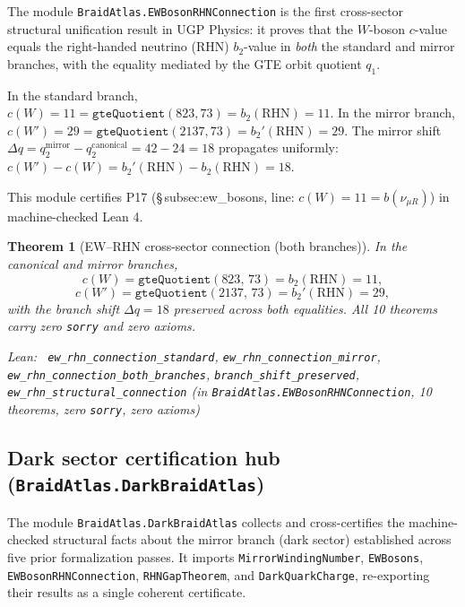 \documentclass[11pt,a4paper]{article}
\newenvironment{leanref}%
  {\par\smallskip\noindent\begingroup\raggedright\textup{Lean:}~}%
  {\par\endgroup}
\newtheorem{theorem}{Theorem}[section]
\theoremstyle{definition}
\begin{document}
The module \texttt{BraidAtlas.EWBosonRHNConnection} is the first cross-sector
structural unification result in UGP Physics: it proves that the $W$-boson
$c$-value equals the right-handed neutrino (RHN) $b_2$-value in \emph{both}
the standard and mirror branches, with the equality mediated by the GTE orbit
quotient $q_1$.

In the standard branch,
$c(W) = 11 = \mathtt{gteQuotient}(823, 73) = b_2(\text{RHN}) = 11$.
In the mirror branch,
$c(W') = 29 = \mathtt{gteQuotient}(2137, 73) = b_2'(\text{RHN}) = 29$.
The mirror shift $\Delta q = q_2^{\text{mirror}} - q_2^{\text{canonical}} = 42 - 24 = 18$
propagates uniformly: $c(W') - c(W) = b_2'(\text{RHN}) - b_2(\text{RHN}) = 18$.

This module certifies P17 \cite{SpivackBraidAtlas} (\S\,subsec:ew\_bosons,
line: $c(W) = 11 = b(\nu_{\mu R})$) in machine-checked Lean 4.

\begin{theorem}[EW--RHN cross-sector connection (both branches)]\label{thm:ew_rhn}
In the canonical and mirror branches,
\[
  c(W) = \mathtt{gteQuotient}(823,\, 73) = b_2(\mathrm{RHN}) = 11,
\]
\[
  c(W') = \mathtt{gteQuotient}(2137,\, 73) = b_2'(\mathrm{RHN}) = 29,
\]
with the branch shift $\Delta q = 18$ preserved across both equalities.
All 10 theorems carry zero \texttt{sorry} and zero axioms.
\begin{leanref}
\lstinline|ew_rhn_connection_standard|,
\lstinline|ew_rhn_connection_mirror|,
\lstinline|ew_rhn_connection_both_branches|,
\lstinline|branch_shift_preserved|,
\lstinline|ew_rhn_structural_connection|
\textup{(in \texttt{BraidAtlas.EWBosonRHNConnection}, 10 theorems, zero \texttt{sorry},
zero axioms)}
\end{leanref}
\end{theorem}

\subsection{Dark sector certification hub
            (\texttt{BraidAtlas.DarkBraidAtlas})}
\label{subsec:dark_braid_atlas_lean}

The module \texttt{BraidAtlas.DarkBraidAtlas} collects and cross-certifies the
machine-checked structural facts about the mirror branch (dark sector) established
across five prior formalization passes.  It imports
\texttt{MirrorWindingNumber}, \texttt{EWBosons}, \texttt{EWBosonRHNConnection},
\texttt{RHNGapTheorem}, and \texttt{DarkQuarkCharge}, re-exporting their results
as a single coherent certificate.
\end{document}

